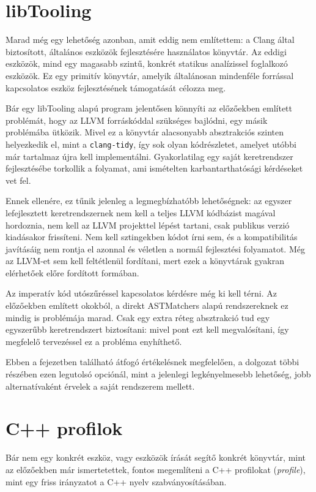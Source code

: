 \section*{libTooling}

Marad még egy lehetőség azonban, amit eddig nem említettem: a Clang által biztosított, általános eszközök fejlesztésére használatos könyvtár.
Az eddigi eszközök, mind egy magasabb szintű, konkrét statikus analízissel foglalkozó eszközök.
Ez egy primitív könyvtár, amelyik általánosan mindenféle forrással kapcsolatos eszköz fejlesztésének támogatását célozza meg.

Bár egy libTooling alapú program jelentősen könnyíti az előzőekben említett problémát, hogy az LLVM forráskóddal szükséges bajlódni, egy másik problémába ütközik.
Mivel ez a könyvtár alacsonyabb absztrakciós szinten helyezkedik el, mint a {\tt clang-tidy}, így sok olyan kódrészletet, amelyet utóbbi már tartalmaz újra kell implementálni.
Gyakorlatilag egy saját keretrendszer fejlesztésébe torkollik a folyamat, ami ismételten karbantarthatósági kérdéseket vet fel.

Ennek ellenére, ez tűnik jelenleg a legmegbízhatóbb lehetőségnek: az egyszer lefejlesztett keretrendszernek nem kell a teljes LLVM kódbázist magával hordoznia, nem kell az LLVM projekttel lépést tartani, csak publikus verzió kiadásakor frissíteni.
Nem kell sztingekben kódot írni sem, és a kompatibilitás javításáig nem rontja el azonnal és véletlen a normál fejlesztési folyamatot.
Még az LLVM-et sem kell feltétlenül fordítani, mert ezek a könyvtárak gyakran elérhetőek előre fordított formában.

Az imperatív kód utószűréssel kapcsolatos kérdésre még ki kell térni.
Az előzőekben említett okokból, a direkt ASTMatchers alapú rendszereknek ez mindig is problémája marad.
Csak egy extra réteg absztrakció tud egy egyszerűbb keretrendszert biztosítani: mivel pont ezt kell megvalósítani, így megfelelő tervezéssel ez a probléma enyhíthető.

Ebben a fejezetben található átfogó értékelésnek megfelelően, a dolgozat többi részében ezen legutolsó opciónál, mint a jelenlegi legkényelmesebb lehetőség, jobb alternatívaként érvelek a saját rendszerem mellett.

\section*{C++ profilok}

Bár nem egy konkrét eszköz, vagy eszközök írását segítő konkrét könyvtár, mint az előzőekben már ismertetettek, fontos megemlíteni a C++ profilokat ({\it profile}), mint egy friss irányzatot a C++ nyelv szabványosításában.

